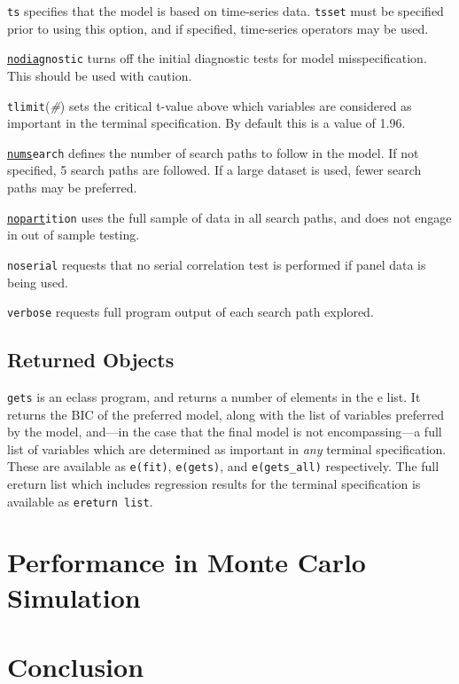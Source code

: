 \documentclass{article}[11pt]
\begin{document}
\begin{spacing}{1.2}
\texttt{ts} specifies that the model is based on time-series data.  \texttt{tsset} must be specified 
prior to using this option, and if specified, time-series operators may be used.

\texttt{\ul{nodiag}nostic} turns off the initial diagnostic tests for model misspecification.  This
should be used with caution.

\texttt{tlimit}(\emph{\#}) sets the critical t-value above which variables are considered as important 
in the terminal specification.  By default this is a value of 1.96.

\texttt{\ul{nums}earch} defines the number of search paths to follow in the model.  If not specified, 5
search paths are followed.  If a large dataset is used, fewer search paths may be preferred.

\texttt{\ul{nopart}ition} uses the full sample of data in all search paths, and does not engage in
out of sample testing.

\texttt{noserial} requests that no serial correlation test is performed if panel data is being used.

\texttt{verbose} requests full program output of each search path explored.

\subsection{Returned Objects}
\texttt{gets} is an eclass program, and returns a number of elements in the e list.  It returns the
BIC of the preferred model, along with the list of variables preferred by the model, and---in the 
case that the final model is not encompassing---a full list of variables which are determined as 
important in \emph{any} terminal specification.  These are available as \texttt{e(fit)}, \texttt{e(gets)},
and \texttt{e(gets\_all)} respectively.  The full ereturn list which includes regression results for
the terminal specification is available as \texttt{ereturn list}.

\section{Performance in Monte Carlo Simulation}

\section{Conclusion}

\newpage


\end{spacing}
\end{document}
